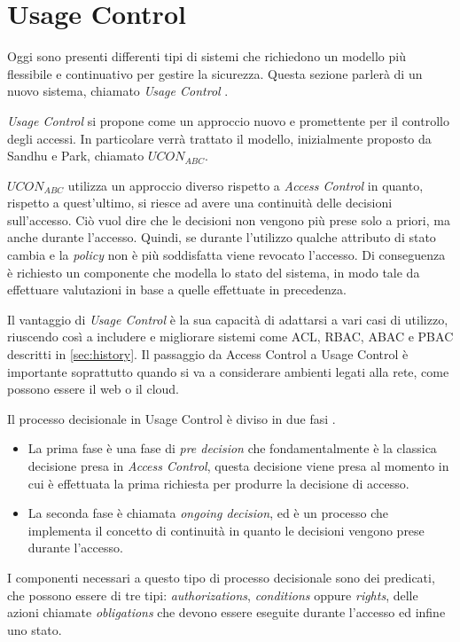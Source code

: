 \section{Usage Control} %
\label{sec:usage_control}
Oggi sono presenti differenti tipi di sistemi che richiedono un modello più flessibile e continuativo per gestire la sicurezza. Questa sezione parlerà di un nuovo sistema, chiamato \textit{Usage Control} \cite{SurveyUsageControl}. \par
\textit{Usage Control} si propone come un approccio nuovo e promettente per il controllo degli accessi. In particolare verrà trattato il modello, inizialmente proposto da Sandhu e Park\cite{SurveyUsageControl}, chiamato $UCON_{ABC}$. \par
$UCON_{ABC}$ utilizza un approccio diverso rispetto a \textit{Access Control} in quanto, rispetto a quest'ultimo, si riesce ad avere una continuità delle decisioni sull'accesso. Ciò vuol dire che le decisioni non vengono più prese solo a priori, ma anche durante l'accesso.  Quindi, se durante l'utilizzo qualche attributo di stato cambia e la \textit{policy} non è più soddisfatta viene revocato l'accesso. Di conseguenza è richiesto un componente che modella lo stato del sistema, in modo tale da effettuare valutazioni in base a quelle effettuate in precedenza. \par
Il vantaggio di \textit{Usage Control} è la sua capacità di adattarsi a vari casi di utilizzo, riuscendo così a includere e migliorare sistemi come \ac{ACL}, \ac{RBAC}, \ac{ABAC} e \ac{PBAC} descritti in \ref{sec:history}.
Il passaggio da Access Control a Usage Control è importante soprattutto quando si va a considerare ambienti legati alla rete, come possono essere il web o il cloud. \par
Il processo decisionale in Usage Control è diviso in due fasi \cite{UsageControlCloud}. 
\begin{itemize}
\item La prima fase è una fase di \textit{pre decision} che fondamentalmente è la classica decisione presa in \textit{Access Control}, questa decisione viene presa al momento in cui è effettuata la prima richiesta per produrre la decisione di accesso.
\item La seconda fase è chiamata \textit{ongoing decision}, ed è un processo che implementa il concetto di continuità in quanto le decisioni vengono prese durante l'accesso.\par
\end{itemize}
I componenti necessari a questo tipo di processo decisionale sono dei predicati, che possono essere di tre tipi: \textit{authorizations}, \textit{conditions} oppure \textit{rights}, delle azioni chiamate \textit{obligations} che devono essere eseguite durante l'accesso ed infine uno stato. 
